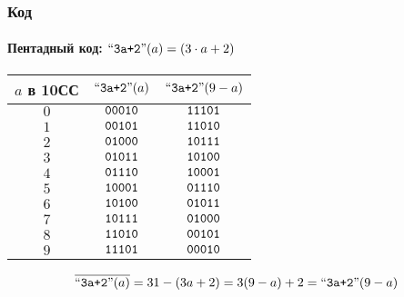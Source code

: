 \begin{frame}
    \frametitle{Код \PentaLabel}
    \framesubtitle{Пентадный код: $\text{``\texttt{3a+2}''}(a)=(3\cdot a + 2)$}
    
    \begin{center}
    \begin{tabular}{|c|c|c|}
        \hline\hline
        $a$ в 10СС  & $\text{``\texttt{3a+2}''}(a)$       & $\text{``\texttt{3a+2}''}(9-a)$\\
        \hline\hline
        $0$         & $\texttt{00010}$  & $\texttt{11101}$ \\
        $1$         & $\texttt{00101}$  & $\texttt{11010}$ \\
        $2$         & $\texttt{01000}$  & $\texttt{10111}$ \\
        $3$         & $\texttt{01011}$  & $\texttt{10100}$ \\
        $4$         & $\texttt{01110}$  & $\texttt{10001}$ \\
        $5$         & $\texttt{10001}$  & $\texttt{01110}$ \\
        $6$         & $\texttt{10100}$  & $\texttt{01011}$ \\
        $7$         & $\texttt{10111}$  & $\texttt{01000}$ \\
        $8$         & $\texttt{11010}$  & $\texttt{00101}$ \\
        $9$         & $\texttt{11101}$  & $\texttt{00010}$ \\
        \hline
    \end{tabular}
    \end{center}
    
    \[
        \overline{\text{``\texttt{3a+2}''}(a)}=31-(3a+2)=3(9-a)+2=\text{``\texttt{3a+2}''}(9-a)
    \]
\end{frame}

